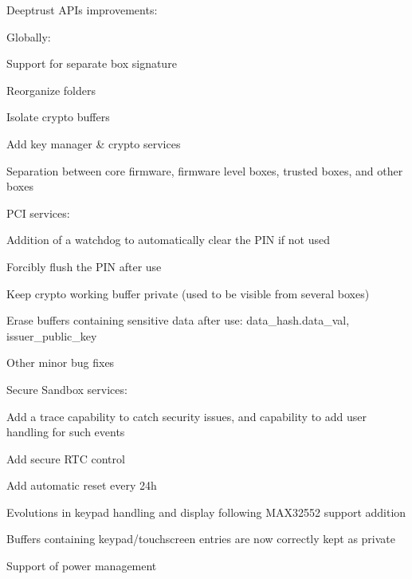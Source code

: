 Deeptrust A\+PI\textquotesingle{}s improvements\+:

Globally\+:
\begin{DoxyItemize}
\item Support for separate box signature
\item Reorganize folders
\item Isolate crypto buffers
\item Add key manager \& crypto services
\item Separation between core firmware, firmware level boxes, trusted boxes, and other boxes
\end{DoxyItemize}

P\+CI services\+:
\begin{DoxyItemize}
\item Addition of a watchdog to automatically clear the P\+IN if not used
\item Forcibly flush the P\+IN after use
\item Keep crypto working buffer private (used to be visible from several boxes)
\item Erase buffers containing sensitive data after use\+: data\+\_\+hash.\+data\+\_\+val, issuer\+\_\+public\+\_\+key
\item Other minor bug fixes
\end{DoxyItemize}

Secure Sandbox services\+:
\begin{DoxyItemize}
\item Add a trace capability to catch security issues, and capability to add user handling for such events
\item Add secure R\+TC control
\item Add automatic reset every 24h
\item Evolutions in keypad handling and display following M\+A\+X32552 support addition
\item Buffers containing keypad/touchscreen entries are now correctly kept as private
\item Support of power management 
\end{DoxyItemize}